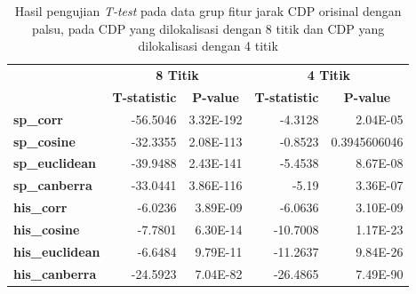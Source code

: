 \begin{table}[h]
	\centering
	\caption{Hasil pengujian \emph{T-test} pada data grup fitur jarak CDP orisinal dengan palsu, pada CDP yang dilokalisasi dengan 8 titik dan CDP yang dilokalisasi dengan 4 titik}
	\vspace{0.5em}
	\begin{tabular}{|l|rr|rr|}
		\hline
		\multirow{2}{*}{}       & \multicolumn{2}{c|}{\textbf{8 Titik}}     & \multicolumn{2}{c|}{\textbf{4 Titik}}                                                                                     \\ \cline{2-5}
		                        & \multicolumn{1}{c|}{\textbf{T-statistic}} & \multicolumn{1}{c|}{\textbf{P-value}} & \multicolumn{1}{c|}{\textbf{T-statistic}} & \multicolumn{1}{c|}{\textbf{P-value}} \\ \hline
		\textbf{sp\_corr}       & \multicolumn{1}{r|}{-56.5046}             & 3.32E-192                             & \multicolumn{1}{r|}{-4.3128}              & 2.04E-05                              \\ \hline
		\textbf{sp\_cosine}     & \multicolumn{1}{r|}{-32.3355}             & 2.08E-113                             & \multicolumn{1}{r|}{-0.8523}              & 0.3945606046                          \\ \hline
		\textbf{sp\_euclidean}  & \multicolumn{1}{r|}{-39.9488}             & 2.43E-141                             & \multicolumn{1}{r|}{-5.4538}              & 8.67E-08                              \\ \hline
		\textbf{sp\_canberra}   & \multicolumn{1}{r|}{-33.0441}             & 3.86E-116                             & \multicolumn{1}{r|}{-5.19}                & 3.36E-07                              \\ \hline
		\textbf{his\_corr}      & \multicolumn{1}{r|}{-6.0236}              & 3.89E-09                              & \multicolumn{1}{r|}{-6.0636}              & 3.10E-09                              \\ \hline
		\textbf{his\_cosine}    & \multicolumn{1}{r|}{-7.7801}              & 6.30E-14                              & \multicolumn{1}{r|}{-10.7008}             & 1.17E-23                              \\ \hline
		\textbf{his\_euclidean} & \multicolumn{1}{r|}{-6.6484}              & 9.79E-11                              & \multicolumn{1}{r|}{-11.2637}             & 9.84E-26                              \\ \hline
		\textbf{his\_canberra}  & \multicolumn{1}{r|}{-24.5923}             & 7.04E-82                              & \multicolumn{1}{r|}{-26.4865}             & 7.49E-90                              \\ \hline

\end{tabular}
\end{table}

